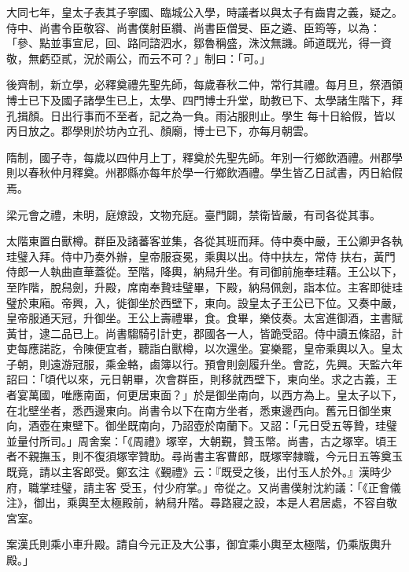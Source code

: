 \begin{pinyinscope}
 大同七年，皇太子表其子寧國、臨城公入學，時議者以與太子有齒胄之義，疑之。侍中、尚書令臣敬容、尚書僕射臣纘、尚書臣僧旻、臣之遴、臣筠等，以為：「參、點並事宣尼，回、路同諮泗水，鄒魯稱盛，洙汶無譏。師道既光，得一資敬，無虧亞貳，況於兩公，而云不可？」制曰：「可。」



 後齊制，新立學，必釋奠禮先聖先師，每歲春秋二仲，常行其禮。每月旦，祭酒領博士已下及國子諸學生已上，太學、四門博士升堂，助教已下、太學諸生階下，拜孔揖顏。日出行事而不至者，記之為一負。雨沾服則止。學生
 每十日給假，皆以丙日放之。郡學則於坊內立孔、顏廟，博士已下，亦每月朝雲。



 隋制，國子寺，每歲以四仲月上丁，釋奠於先聖先師。年別一行鄉飲酒禮。州郡學則以春秋仲月釋奠。州郡縣亦每年於學一行鄉飲酒禮。學生皆乙日試書，丙日給假焉。



 梁元會之禮，未明，庭燎設，文物充庭。臺門闢，禁衛皆嚴，有司各從其事。



 太階東置白獸樽。群臣及諸蕃客並集，各從其班而拜。侍中奏中嚴，王公卿尹各執珪璧入拜。侍中乃奏外辦，皇帝服袞冕，乘輿以出。侍中扶左，常侍
 扶右，黃門侍郎一人執曲直華蓋從。至階，降輿，納舄升坐。有司御前施奉珪藉。王公以下，至阼階，脫舄劍，升殿，席南奉贄珪璧畢，下殿，納舄佩劍，詣本位。主客即徙珪璧於東廂。帝興，入，徙御坐於西壁下，東向。設皇太子王公已下位。又奏中嚴，皇帝服通天冠，升御坐。王公上壽禮畢，食。食畢，樂伎奏。太宮進御酒，主書賦黃甘，逮二品已上。尚書騶騎引計吏，郡國各一人，皆跪受詔。侍中讀五條詔，計吏每應諾訖，令陳便宜者，聽詣白獸樽，以次還坐。宴樂罷，皇帝乘輿以入。皇太子朝，則遠游冠服，乘金輅，鹵簿以行。預會則劍履升坐。會訖，先興。天監六年
 詔曰：「頃代以來，元日朝畢，次會群臣，則移就西壁下，東向坐。求之古義，王者宴萬國，唯應南面，何更居東面？」於是御坐南向，以西方為上。皇太子以下，在北壁坐者，悉西邊東向。尚書令以下在南方坐者，悉東邊西向。舊元日御坐東向，酒壺在東壁下。御坐既南向，乃詔壺於南蘭下。又詔：「元日受五等贄，珪璧並量付所司。」周舍案：「《周禮》塚宰，大朝覲，贊玉幣。尚書，古之塚宰。頃王者不親撫玉，則不復須塚宰贊助。尋尚書主客曹郎，既塚宰隸職，今元日五等奠玉既竟，請以主客郎受。鄭玄注《覲禮》云：『既受之後，出付玉人於外。』漢時少府，職掌珪璧，請主客
 受玉，付少府掌。」帝從之。又尚書僕射沈約議：「《正會儀注》，御出，乘輿至太極殿前，納舄升階。尋路寢之設，本是人君居處，不容自敬宮室。



 案漢氏則乘小車升殿。請自今元正及大公事，御宜乘小輿至太極階，仍乘版輿升殿。」




\end{pinyinscope}
